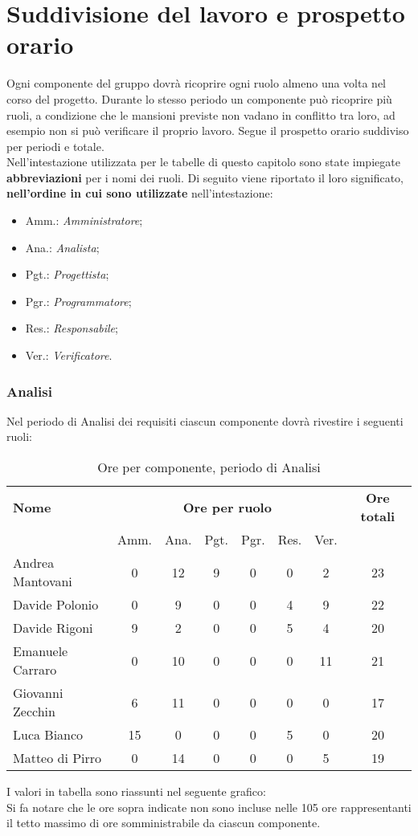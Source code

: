\section{Suddivisione del lavoro e prospetto orario}
Ogni componente del gruppo dovrà ricoprire ogni ruolo almeno una volta nel corso del progetto.
Durante lo stesso periodo un componente può ricoprire più ruoli, a condizione che le mansioni previste non vadano in conflitto tra loro, ad esempio non si può verificare il proprio lavoro.
Segue il prospetto orario suddiviso per periodi e totale. \\

Nell'intestazione utilizzata per le tabelle di questo capitolo sono state impiegate \textbf{abbreviazioni} per i nomi dei ruoli.
Di seguito viene riportato il loro significato, \textbf{nell'ordine in cui sono utilizzate} nell'intestazione:
\begin{itemize}
\item Amm.: \textit{Amministratore};
\item Ana.: \textit{Analista};
\item Pgt.: \textit{Progettista};
\item Pgr.: \textit{Programmatore};
\item Res.: \textit{Responsabile};
\item Ver.: \textit{Verificatore}.
\end{itemize}

\pagebreak
\subsubsection{Analisi}
Nel periodo di Analisi dei requisiti ciascun componente dovrà rivestire i seguenti ruoli:
\noindent
\begin{table}[H]
\begin{tabular}{lccccccc}
\toprule
    \textbf{Nome}  & \multicolumn{6}{c}{\textbf{Ore per ruolo}} & \textbf{Ore totali} \\
     & Amm. & Ana. & Pgt. & Pgr. & Res. & Ver. & \\
    \midrule
    
	Andrea Mantovani & 0 & 12 & 9 & 0 & 0 & 2 & 23 \\
	Davide Polonio & 0 & 9 & 0 & 0 & 4 & 9 & 22 \\
	Davide Rigoni & 9 & 2 & 0 & 0 & 5 & 4 & 20 \\
	Emanuele Carraro & 0 & 10 & 0 & 0 & 0 & 11 & 21 \\
	Giovanni Zecchin & 6 & 11 & 0 & 0 & 0 & 0 & 17 \\
	Luca Bianco & 15 & 0 & 0 & 0 & 5 & 0 & 20 \\
	Matteo di Pirro & 0 & 14 & 0 & 0 & 0 & 5 & 19 \\
    
    \bottomrule
\end{tabular}
\caption{Ore per componente, periodo di Analisi}
\end{table}

I valori in tabella sono riassunti nel seguente grafico: \\ 

Si fa notare che le ore sopra indicate non sono incluse nelle 105 ore rappresentanti il tetto massimo di ore somministrabile da ciascun componente.